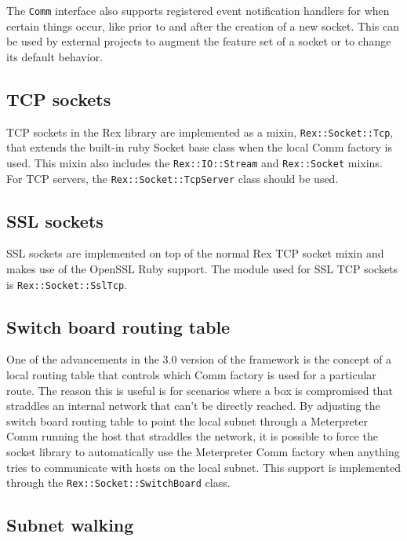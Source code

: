 \documentclass{report}
\begin{document}
\par
The \texttt{Comm} interface also supports registered event
notification handlers for when certain things occur, like prior to
and after the creation of a new socket.  This can be used by
external projects to augment the feature set of a socket or to
change its default behavior.

        \subsection{TCP sockets}

\par
TCP sockets in the Rex library are implemented as a mixin,
\texttt{Rex::Socket::Tcp}, that extends the built-in ruby Socket
base class when the local Comm factory is used.  This mixin also
includes the \texttt{Rex::IO::Stream} and \texttt{Rex::Socket}
mixins.  For TCP servers, the \texttt{Rex::Socket::TcpServer} class
should be used.

        \subsection{SSL sockets}

\par
SSL sockets are implemented on top of the normal Rex TCP socket
mixin and makes use of the OpenSSL Ruby support.  The module used
for SSL TCP sockets is \texttt{Rex::Socket::SslTcp}.

        \subsection{Switch board routing table}

\par
One of the advancements in the 3.0 version of the framework is the
concept of a local routing table that controls which Comm factory is
used for a particular route.  The reason this is useful is for
scenarios where a box is compromised that straddles an internal
network that can't be directly reached.  By adjusting the switch
board routing table to point the local subnet through a Meterpreter
Comm running the host that straddles the network, it is possible to
force the socket library to automatically use the Meterpreter Comm
factory when anything tries to communicate with hosts on the local
subnet.  This support is implemented through the
\texttt{Rex::Socket::SwitchBoard} class.

        \subsection{Subnet walking}
\end{document}
